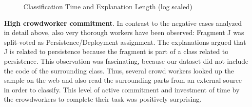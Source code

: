 \begin{figure}[h]
\centering



\caption[Classification Time, Explanation Length]{Classification Time and Explanation Length (log scaled) \autocite{Heil2019CSRECCIS}}
\label{fig:csre-scatterplots}
\end{figure}

\textbf{High crowdworker commitment}. In contrast to the negative cases analyzed in detail above, also very thorough workers have been observed: Fragment J was split-voted as Persistence/Deployment assignment.
The explanations argued that J is related to persistence because the fragment is part of a class related to persistence.
This observation was
fascinating, because our dataset did not include the code of the surrounding class.
Thus, several crowd workers looked up the sample on the \gls{web} and also read the surrounding parts from an external source in order to classify.
This level of active commitment and investment of time by the crowdworkers
to complete their task was positively surprising.

